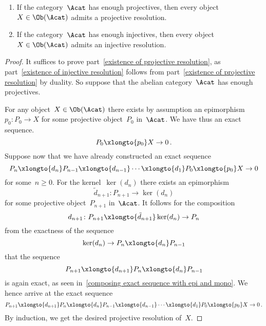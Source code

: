 \begin{lemma}
  \leavevmode
  \begin{enumerate}
    \item
      \label{existence of projective resolution}
      If the category~$\Acat$ has enough projectives, then every object~$X \in \Ob(\Acat)$ admits a projective resolution.
    \item
      \label{existence of injective resolution}
      If the category~$\Acat$ has enough injectives, then every object~$X \in \Ob(\Acat)$ admits an injective resolution.
  \end{enumerate}
\end{lemma}


\begin{proof}
  It suffices to prove part~\ref*{existence of projective resolution}, as part~\ref*{existence of injective resolution} follows from part~\ref*{existence of projective resolution} by duality.
  So suppose that the abelian category~$\Acat$ has enough projectives.
  
  For any object~$X \in \Ob(\Acat)$ there exists by assumption an epimorphism~$p_0 \colon P_0 \to X$ for some projective object~$P_0$ in~$\Acat$.
  We have thus an exact sequence.
  \[
    P_0
    \xlongto{p_0}
    X
    \to
    0 \,.
  \]
  Suppose now that we have already constructed an exact sequence
  \[
    P_n
    \xlongto{d_n}
    P_{n-1}
    \xlongto{d_{n-1}}
    \dotsb
    \xlongto{d_1}
    P_0
    \xlongto{p_0}
    X
    \to
    0
  \]
  for some~$n \geq 0$.
  For the kernel~$\ker(d_n)$ there exists an epimorphism
  \[
    \tilde{d}_{n+1}
    \colon
    P_{n+1}
    \to
    \ker(d_n)
  \]
  for some projective object~$P_{n+1}$ in~$\Acat$.
  It follows for the composition
  \[
    d_{n+1}
    \colon
    P_{n+1}
    \xlongto{\tilde{d}_{n+1}}
    \ker(d_n)
    \to
    P_n
  \]
  from the exactness of the sequence
  \[
    \ker(d_n)
    \to
    P_n
    \xlongto{d_n}
    P_{n-1}
  \]
  that the sequence
  \[
    P_{n+1}
    \xlongto{d_{n+1}}
    P_n
    \xlongto{d_n}
    P_{n-1}
  \]
  is again exact, as seen in~\cref{composing exact sequence with epi and mono}.
  We hence arrive at the exact sequence
  \[
    P_{n+1}
    \xlongto{d_{n+1}}
    P_n
    \xlongto{d_n}
    P_{n-1}
    \xlongto{d_{n-1}}
    \dotsb
    \xlongto{d_1}
    P_0
    \xlongto{p_0}
    X
    \to
    0 \,.
  \]
  By induction, we get the desired projective resolution of~$X$.
\end{proof}


